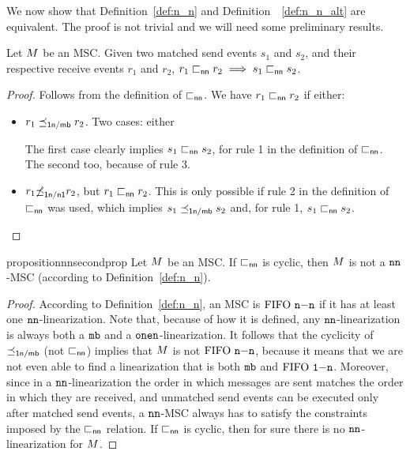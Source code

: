 We now show that Definition~\ref{def:n_n} and Definition~~\ref{def:n_n_alt}
are equivalent. The proof is not trivial and we will need some preliminary results.

\begin{proposition}\label{prop:nn_first_prop}
	Let $M$ be an MSC. Given two matched send events $s_1$ and $s_2$, and their respective receive events $r_1$ and $r_2$, $r_1 \sqsubset_{\mathsf{nn}} r_2 \implies s_1 \sqsubset_{\mathsf{nn}} s_2$.
\end{proposition}
\begin{proof}
    Follows from the definition of $\sqsubset_{\mathsf{nn}}$. We have $r_1 \sqsubset_{\mathsf{nn}} r_2$ if either:
    \begin{itemize}%
        \item $r_1 \preceq_{\mathsf{1n/\mathsf{mb}}} r_2$. Two cases: either 
        The first case clearly implies $s_1 \sqsubset_{\mathsf{nn}} s_2$, for rule 1 in the definition of $\sqsubset_{\mathsf{nn}}$. The second too, because of rule 3.
        \item  $r_1 {\not\preceq}_{\mathsf{1n/n1}} r_2$, but $r_1 \sqsubset_{\mathsf{nn}} r_2$. This is only possible if rule 2 in the definition of $\sqsubset_{\mathsf{nn}}$ was used, which implies $s_1 \preceq_{\mathsf{1n/\mathsf{mb}}} s_2$ and, for rule 1, $s_1 \sqsubset_{\mathsf{nn}} s_2$.
    \end{itemize}
\end{proof}

\begin{restatable}{proposition}{nnsecondprop}
\label{prop:n_n_cycl}
	Let $M$ be an MSC. If $\sqsubset_{\mathsf{nn}}$ is cyclic, then $M$ is not a $\mathtt{nn}$-MSC (according to Definition~\ref{def:n_n}).
\end{restatable}
\begin{proof}
    According to Definition~\ref{def:n_n}, an MSC is $\text{FIFO } \mathtt{n\mathsf{-}n}$ if it has at least one $\mathtt{nn}$-linearization. Note that, because of how it is defined, any $\mathtt{nn}$-linearization is always both a $\mathtt{mb}$ and a $\mathtt{onen}$-linearization. It follows that the cyclicity of $\preceq_{\mathsf{1n/\mathsf{mb}}}$ (not $\sqsubset_{\mathsf{nn}}$) implies that $M$ is not $\text{FIFO } \mathtt{n\mathsf{-}n}$, because it means that we are not even able to find a linearization that is both $\mathtt{mb}$ and $\text{FIFO } \mathtt{1\mathsf{-}n}$. Moreover, since in a $\mathtt{nn}$-linearization the order in which messages are sent matches the order in which they are received, and unmatched send events can be executed only after matched send events, a $\mathtt{nn}$-MSC always has to satisfy the constraints imposed by the $\sqsubset_{\mathsf{nn}}$ relation. If $\sqsubset_{\mathsf{nn}}$ is cyclic, then for sure there is no $\mathtt{nn}$-linearization for $M$.
\end{proof}    

